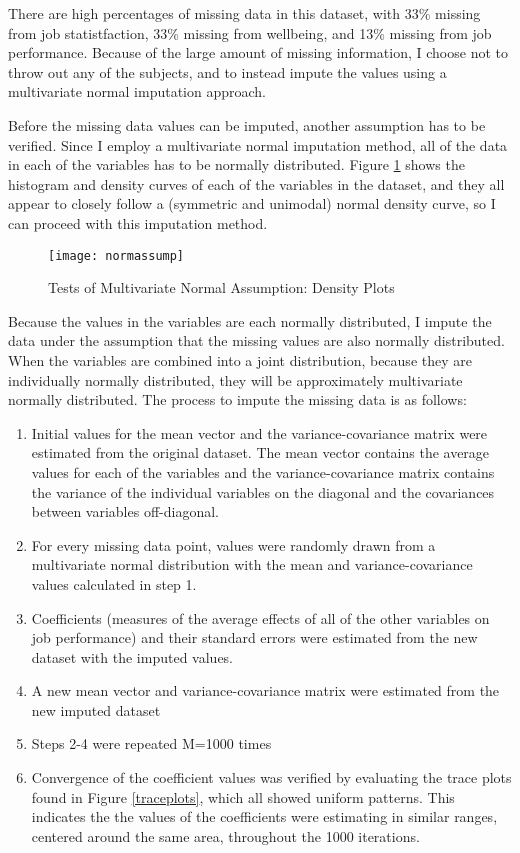 \documentclass{svproc}
\begin{document}
There are high percentages of missing data in this dataset, with 33\% missing from job statistfaction, 33\% missing from wellbeing, and 13\% missing from job performance. Because of the large amount of missing information, I choose not to throw out any of the subjects, and to instead impute the values using a multivariate normal imputation approach. 

Before the missing data values can be imputed, another assumption has to be verified. Since I employ a multivariate normal imputation method, all of the data in each of the variables has to be normally distributed. Figure \ref{normassump} shows the histogram and density curves of each of the variables in the dataset, and they all appear to closely follow a (symmetric and unimodal) normal density curve, so I can proceed with this imputation method. 

\begin{figure}
\begin{center}
\caption{Tests of Multivariate Normal Assumption: Density Plots}
\texttt{[image: normassump]}
\label{normassump}
\smallskip
\end{center}
\end{figure}

Because the values in the variables are each normally distributed, I impute the data under the assumption that the missing values are also normally distributed. When the variables are combined into a joint distribution, because they are individually normally distributed, they will be approximately multivariate normally distributed. The process to impute the missing data is as follows: 

\begin{enumerate}
\item Initial values for the mean vector and the variance-covariance matrix were estimated from the original dataset. The mean vector contains the average values for each of the variables and the variance-covariance matrix contains the variance of the individual variables on the diagonal and the covariances between variables off-diagonal.
\item For every missing data point, values were randomly drawn from a multivariate normal distribution with the mean and variance-covariance values calculated in step 1.
\item Coefficients (measures of the average effects of all of the other variables on job performance) and their standard errors were estimated from the new dataset with the imputed values.
\item A new mean vector and variance-covariance matrix were estimated from the new imputed dataset 
\item Steps 2-4 were repeated M=1000 times
\item Convergence of the coefficient values was verified by evaluating the trace plots found in Figure \ref{traceplots}, which all showed uniform patterns. This indicates the the values of the coefficients were estimating in similar ranges, centered around the same area, throughout the 1000 iterations. 
\end{enumerate}
\end{document}
